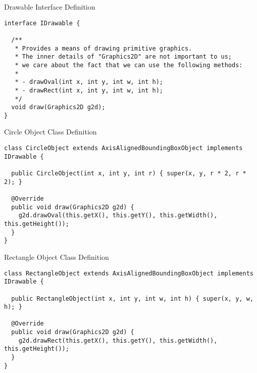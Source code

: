 \begin{cl}[]{Drawable Interface Definition}
\begin{lstlisting}[language=MyJava]
interface IDrawable {
  
  /**
   * Provides a means of drawing primitive graphics.
   * The inner details of "Graphics2D" are not important to us; 
   * we care about the fact that we can use the following methods:
   * 
   * - drawOval(int x, int y, int w, int h);
   * - drawRect(int x, int y, int w, int h);
   */
  void draw(Graphics2D g2d); 
}
\end{lstlisting}
\end{cl} 

\begin{cl}[]{Circle Object Class Definition}
\begin{lstlisting}[language=MyJava]
class CircleObject extends AxisAlignedBoundingBoxObject implements IDrawable {
  
  public CircleObject(int x, int y, int r) { super(x, y, r * 2, r * 2); }

  @Override
  public void draw(Graphics2D g2d) {
    g2d.drawOval(this.getX(), this.getY(), this.getWidth(), this.getHeight());
  }
}
\end{lstlisting}
\end{cl}

\begin{cl}[]{Rectangle Object Class Definition}
\begin{lstlisting}[language=MyJava]
class RectangleObject extends AxisAlignedBoundingBoxObject implements IDrawable {
  
  public RectangleObject(int x, int y, int w, int h) { super(x, y, w, h); }
  
  @Override
  public void draw(Graphics2D g2d) {
    g2d.drawRect(this.getX(), this.getY(), this.getWidth(), this.getHeight());
  }
}
\end{lstlisting}
\end{cl}


